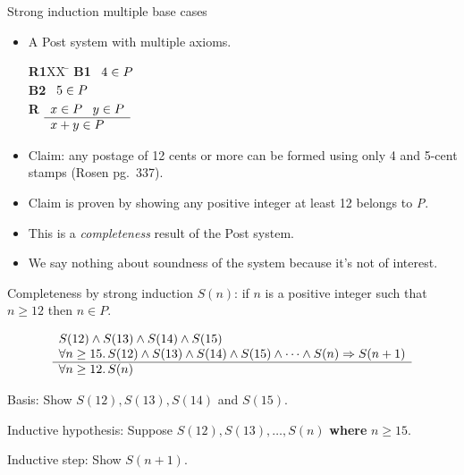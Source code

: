 \documentclass[style=sailor,size=12pt]{powerdot}
\begin{document}
\begin{wideslide}[bm=,toc=]{Strong induction multiple base cases}
\begin{itemize}
\item A Post system with multiple axioms.
\vspace{-1em}
\begin{tabbing}
{\bf R1}XX \=  \kill
{\bf B1} \>
        \(\begin{array}[t]{l}
        4\in P
        \end{array}\) \\[2ex]
{\bf B2} \>
        \(\begin{array}[t]{l}
        5\in P
        \end{array}\) \\[2ex]
        
{\bf R} \>
        \(\begin{array}[t]{l}
        x \in P \;\;\;y \in P \\
        \hline
        x + y \in P
        \end{array}\)
\end{tabbing}
\item Claim: any postage of 12 cents or more can be formed using only 4 and 5-cent stamps (Rosen pg.\ 337).
\item Claim is proven by showing any positive integer at least 12 belongs to {\em P\/}.
\item This is a {\em completeness\/} result of the Post system.
\item We say nothing about soundness of the system because it's not of interest. 
\end{itemize}
\end{wideslide}

\begin{wideslide}[bm=,toc=]{Completeness by strong induction}
$S(n)$: if $n$ is a positive integer such that $n\geq 12$ then $n\in P$.

\begin{displaymath}
\begin{array}[t]{l}
S(12) \wedge S(13) \wedge S(14) \wedge S(15) \\
\forall n\geq 15.\, S(12)\wedge S(13)\wedge S(14)\wedge S(15)\wedge\cdots\wedge S(n)\Rightarrow S(n+1) \\
\hline
\forall n\geq 12.\, S(n)
\end{array}
\end{displaymath}

\vspace{1em}
Basis: Show $S(12),S(13),S(14)$ and $S(15)$.

\vspace{1em}
Inductive hypothesis: Suppose $S(12),S(13),\ldots , S(n)$ {\bf where} $n\geq 15$.

\vspace{1em}
Inductive step: Show $S(n+1)$.
\end{wideslide}
\end{document}
